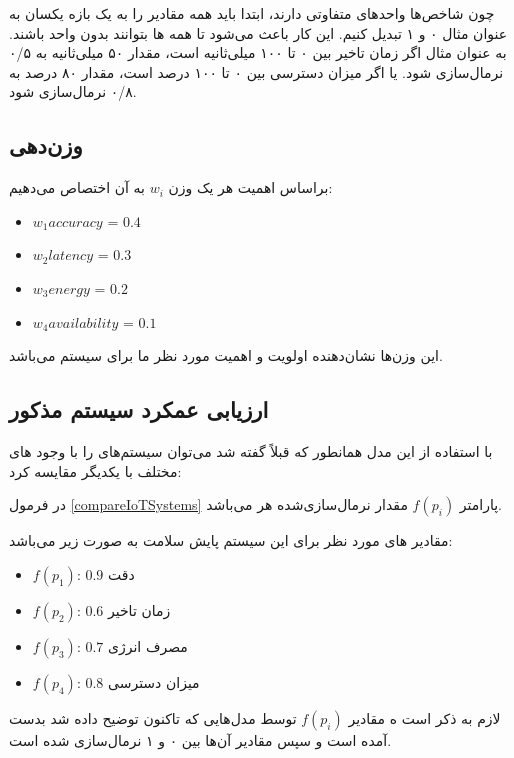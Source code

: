 چون شاخص‌ها واحد‌های متفاوتی دارند، ابتدا باید همه مقادیر را به یک بازه یکسان به
عنوان مثال ۰ و ۱ تبدیل کنیم. این کار باعث می‌شود تا همه ها بتوانند بدون
واحد باشند. به عنوان مثال اگر زمان تاخیر بین ۰ تا ۱۰۰ میلی‌ثانیه است، مقدار ۵۰
میلی‌ثانیه به ۰/۵ نرمال‌سازی شود. یا اگر میزان دسترسی بین ۰ تا ۱۰۰ درصد است،
مقدار ۸۰ درصد به ۰/۸ نرمال‌سازی شود.

\subsection*{وزن‌دهی}

براساس اهمیت هر  یک وزن $w_i$ به آن اختصاص می‌دهیم:

\begin{LTR}
    \begin{itemize}
        \item $w_1{accuracy}$ = $0.4$
        \item $w_2{latency}$ = $0.3$
        \item $w_3{energy}$ = $0.2$
        \item $w_4{availability}$ = $0.1$
    \end{itemize}
\end{LTR}

این وزن‌ها نشان‌دهنده اولویت و اهمیت  مورد نظر ما برای سیستم 
می‌باشد.

\subsection*{ارزیابی عمکرد سیستم مذکور}

با استفاده از این مدل همانطور که قبلاً گفته شد می‌توان سیستم‌های  را با
وجود های مختلف با یکدیگر مقایسه کرد:

در فرمول \ref{compareIoTSystems} پارامتر $f(p_i)$ مقدار نرمال‌سازی‌شده هر
 می‌باشد.

مقادیر های مورد نظر برای این سیستم پایش سلامت به صورت زیر می‌باشد: 

\begin{itemize}
    \item $f(p_1)$: $0.9$ دقت
    \item $f(p_2)$: $0.6$ زمان تاخیر
    \item $f(p_3)$: $0.7$ مصرف انرژی
    \item $f(p_4)$: $0.8$ میزان دسترسی
\end{itemize}

لازم به ذکر است ه مقادیر $f(p_i)$ توسط مدل‌هایی که تاکنون توضیح داده شد بدست
آمده است و سپس مقادیر آن‌ها بین ۰ و ۱ نرمال‌سازی شده است.

